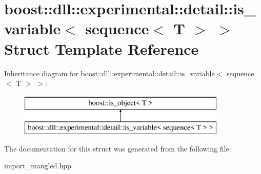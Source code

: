 \hypertarget{a01684}{}\section{boost\+:\+:dll\+:\+:experimental\+:\+:detail\+:\+:is\+\_\+variable$<$ sequence$<$ T $>$ $>$ Struct Template Reference}
\label{a01684}
Inheritance diagram for boost\+:\+:dll\+:\+:experimental\+:\+:detail\+:\+:is\+\_\+variable$<$ sequence$<$ T $>$ $>$\+:\begin{figure}[H]
\begin{center}
\leavevmode
\includegraphics[height=2.000000cm]{a01684}
\end{center}
\end{figure}


The documentation for this struct was generated from the following file\+:\begin{DoxyCompactItemize}
\item 
import\+\_\+mangled.\+hpp\end{DoxyCompactItemize}
